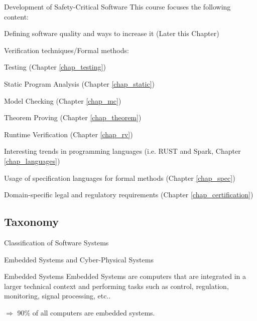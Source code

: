 \begin{frame}{Development of Safety-Critical Software}
	This course focuses the following content:
	\begin{beameritemize}
		\item Defining software quality and ways to increase it (Later this Chapter)
		\item Verification techniques/Formal methods:
		\begin{beameritemize}
			\item Testing (Chapter \ref{chap_testing})
			\item Static Program Analysis (Chapter \ref{chap_static})
			\item Model Checking (Chapter \ref{chap_mc})
			\item Theorem Proving (Chapter \ref{chap_theorem})
			\item Runtime Verification (Chapter \ref{chap_rv})
		\end{beameritemize}
		\item Interesting trends in programming languages (i.e. RUST and Spark, Chapter \ref{chap_languages}) 
		\item Usage of specification languages for formal methods (Chapter \ref{chap_spec})
		\item Domain-specific legal and regulatory requirements (Chapter \ref{chap_certification})
	\end{beameritemize}	
	
\end{frame}


\subsection{Taxonomy}

\begin{frame}{Classification of Software Systems}
	
\centering
\resizebox{!}{.8\textheight}{%
	
}%
	
\end{frame}

\begin{frame}{Embedded Systems and Cyber-Physical Systems}
	
	\begin{block}{Embedded Systems}
		Embedded Systems are computers that are integrated in a larger technical context and performing tasks such as control, regulation, monitoring, signal processing, etc..
	\end{block}

	$\Rightarrow$ 90\% of all computers are embedded systems.

\end{frame}


